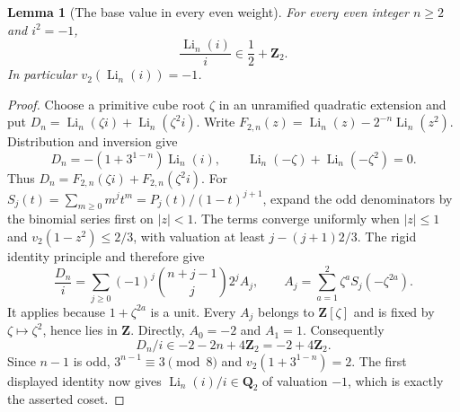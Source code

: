 \documentclass[11pt,a4paper]{article}
\newtheorem{lemma}[theorem]{Lemma}
\theoremstyle{remark}
\newcommand{\Q}{\mathbf Q}
\newcommand{\Z}{\mathbf Z}
\begin{document}
\begin{lemma}[The base value in every even weight]
\label{lem:evenweightibase}
For every even integer $n\geq2$ and $i^2=-1$,
\[
 \frac{\operatorname{Li}_n(i)}{i}\in\frac12+\Z_2.
\]
In particular $v_2(\operatorname{Li}_n(i))=-1$.
\end{lemma}
\begin{proof}
Choose a primitive cube root $\zeta$ in an unramified quadratic
extension and put
$D_n=\operatorname{Li}_n(\zeta i)+\operatorname{Li}_n(\zeta^2i)$.
Write $F_{2,n}(z)=\operatorname{Li}_n(z)-2^{-n}\operatorname{Li}_n(z^2)$.
Distribution and inversion give
\[
 D_n=-(1+3^{1-n})\operatorname{Li}_n(i),\qquad
 \operatorname{Li}_n(-\zeta)+\operatorname{Li}_n(-\zeta^2)=0.
\]
Thus $D_n=F_{2,n}(\zeta i)+F_{2,n}(\zeta^2i)$.
For $S_j(t)=\sum_{m\geq0}m^jt^m
=P_j(t)/(1-t)^{j+1}$, expand the odd denominators by the binomial
series first on $|z|<1$. The terms converge uniformly when
$|z|\leq1$ and $v_2(1-z^2)\leq2/3$, with valuation at least
$j-(j+1)2/3$. The rigid identity principle and
\cite[Theorem~2.7(3)]{BesserDeJeuAlgorithm} therefore give
\[
 \frac{D_n}{i}
 =\sum_{j\geq0}(-1)^j\binom{n+j-1}{j}2^j A_j,
 \qquad A_j=\sum_{a=1}^2\zeta^a S_j(-\zeta^{2a}).
\]
It applies because $1+\zeta^{2a}$ is a unit.
Every $A_j$ belongs to $\Z[\zeta]$ and is fixed by
$\zeta\mapsto\zeta^2$, hence lies in $\Z$.
Directly, $A_0=-2$ and $A_1=1$.
Consequently
\[
 D_n/i\in-2-2n+4\Z_2=-2+4\Z_2.
\]
Since $n-1$ is odd, $3^{n-1}\equiv3\pmod8$ and
$v_2(1+3^{1-n})=2$.
The first displayed identity now gives
$\operatorname{Li}_n(i)/i\in\Q_2$ of valuation $-1$,
which is exactly the asserted coset.
\end{proof}
\end{document}
